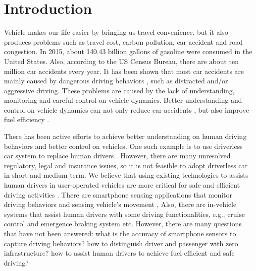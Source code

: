
\chapter{Introduction} 


Vehicle makes our life easier by bringing us travel convenience, 
but it also produces problems such as travel cost, carbon pollution, 
car accident and road congestion.
In 2015, about 140.43 billion gallons of gasoline were consumed in the United States. 
Also, according to the US Census Bureau, there are about ten million car accidents every year.
It has been shown that most car accidents are mainly 
caused by dangerous driving behaviors \cite{progressive}, such as distracted and/or aggressive driving.  
These problems are caused by the lack of understanding, monitoring 
and careful control on vehicle dynamics. 
Better understanding and control on vehicle dynamics
can not only reduce car accidents \cite{progressive}, 
but also improve fuel efficiency \cite{morganstanley2013}. 


There has been active efforts to achieve better understanding on
human driving behaviors and better control on vehicles. 
One such example is to use driverless car system to 
replace human drivers \cite{googledriverlesscar, kumar2012carspeak,
urmson2008autonomous,litman2013autonomous}. 
However, there are many unresolved regulatory, legal and insurance issues, 
so it is not feasible to adopt driverless car in short and medium term.   
We believe that using existing technologies to assists human drivers
in user-operated vehicles are more critical for safe and efficient driving activities \cite{you2013carsafe, wang2013sensing, chen2015invisible, uber}. 
There are smartphone sensing applications that 
monitor driving behaviors and sensing vehicle's movement \cite{you2013carsafe, wang2013sensing},
Also, there are in-vehicle systems that assist human drivers with some driving functionalities, 
e.g., cruise control \cite{bengtsson2001adaptive, cruise_control} and emergence braking system \cite{emergency_brake} etc. 
However, there are many questions that have not been answered: 
what is the accuracy of smartphone sensors to capture driving behaviors?
how to distinguish driver and passenger with zero infrastructure?
how to assist human drivers to achieve fuel efficient and safe driving?


